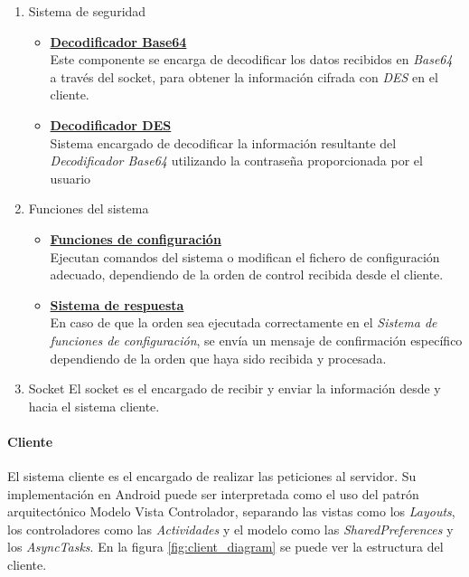 \documentclass[12pt, twoside]{article}
\begin{document}
            \begin{enumerate}
                \item Sistema de seguridad
                    \begin{itemize}
                        \item \textbf{\underline{Decodificador Base64}} \\
                            Este componente se encarga de decodificar los datos recibidos en \textit{Base64} a través del socket, para obtener la información cifrada con \textit{DES} en el cliente.
                        \item \textbf{\underline{Decodificador DES}} \\ 
                            Sistema encargado de decodificar la información resultante del \textit{Decodificador Base64} utilizando la contraseña proporcionada por el usuario
                    \end{itemize}
                \item Funciones del sistema
                    \begin{itemize}
                        \item \textbf{\underline{Funciones de configuración}} \\ 
                            Ejecutan comandos del sistema o modifican el fichero de configuración adecuado, dependiendo de la orden de control recibida desde el cliente.
                        \item \textbf{\underline{Sistema de respuesta}} \\
                            En caso de que la orden sea ejecutada correctamente en el \textit{Sistema de funciones de configuración}, se envía un mensaje de confirmación específico dependiendo de la orden que haya sido recibida y procesada.
                    \end{itemize}
                \item Socket
                    El socket es el encargado de recibir y enviar la información desde y hacia el sistema cliente.
            \end{enumerate}

            \paragraph{ Cliente}
            El sistema cliente es el encargado de realizar las peticiones al servidor. Su implementación en Android puede ser interpretada como el uso del patrón arquitectónico Modelo Vista Controlador, separando las vistas como los \textit{Layouts}, los controladores como las \textit{Actividades} y el modelo como las \textit{SharedPreferences} y los \textit{AsyncTasks}. En la figura \ref{fig:client_diagram} se puede ver la estructura del cliente.
\end{document}
